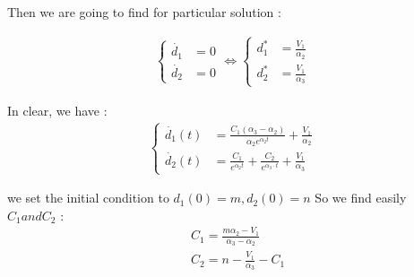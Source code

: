 \documentclass{article}
\begin{document}
	Then we are going to find for particular solution : 
	
	
	\begin{align*}
		\begin{cases}
			\dot{d_1} &= 0 \\
			\dot{d_2} &= 0
		\end{cases} \iff 
		\begin{cases}
			d_1^* &= \frac{V_1}{\alpha_2} \\
			d_2^* &= \frac{V_1}{\alpha_3}
		\end{cases}
	\end{align*}
	
	In clear, we have : 
	\begin{align*}
		\begin{cases}
			\dot{d_1}(t) &= \frac{C_1(\alpha_3-\alpha_2)}{\alpha_2e^{\alpha_2t}}+ \frac{V_1}{\alpha_2}\\
			\dot{d_2}(t) &= \frac{C_1}{e^{\alpha_2t}} + \frac{C_2}{e^{\alpha_3 \cdot t}} + \frac{V_1}{\alpha_3}
		\end{cases}
	\end{align*}
	
	we set the initial condition to \newline 
	$d_1(0)=m, d_2(0)=n$ So we find easily $C_1 and C_2$ : 
	\begin{align*}
		&C_1=\frac{m\alpha_2-V_1}{\alpha_3-\alpha_2} \\
		&C_2=n-\frac{V_1}{\alpha_3} - C_1
	\end{align*}
	
	\newpage
	
	\printbibliography
\end{document}
